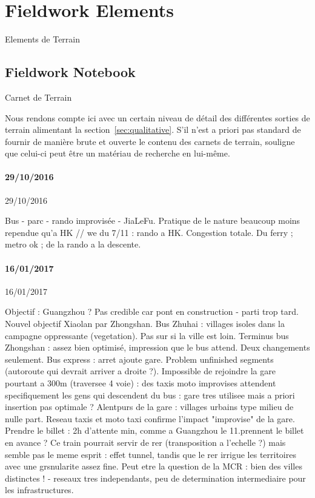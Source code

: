 




\section{Fieldwork Elements}{Elements de Terrain}

\label{app:sec:qualitative}



\subsection{Fieldwork Notebook}{Carnet de Terrain}

Nous rendons compte ici avec un certain niveau de détail des différentes sorties de terrain alimentant la section~\ref{sec:qualitative}. S'il n'est a priori pas standard de fournir de manière brute et ouverte le contenu des carnets de terrain, \cite{goffman1989fieldwork} souligne que celui-ci peut être un matériau de recherche en lui-même.



\paragraph{29/10/2016}{29/10/2016}

Bus - parc - rando improvisée - JiaLeFu.
Pratique de le nature beaucoup moins rependue qu'a HK
// we du 7/11 : rando a HK. Congestion totale. Du ferry ; metro ok ; de la rando a la descente.



\paragraph{16/01/2017}{16/01/2017}

Objectif : Guangzhou ? Pas credible car pont en construction - parti trop tard. Nouvel objectif Xiaolan par Zhongshan. Bus Zhuhai : villages isoles dans la campagne oppressante (vegetation). Pas sur si la ville est loin. Terminus bus Zhongshan : assez bien optimisé, impression que le bus attend. Deux changements seulement. Bus express : arret ajoute gare. Problem unfinished segments (autoroute qui devrait arriver a droite ?). Impossible de rejoindre la gare pourtant a 300m (traversee 4 voie) : des taxis moto improvises attendent specifiquement les gens qui descendent du bus : gare tres utilisee mais a priori insertion pas optimale ? Alentpurs de la gare : villages urbains type milieu de nulle part. Reseau taxis et moto taxi confirme l'impact "improvise" de la gare. Prendre le billet : 2h d'attente min, comme a Guangzhou le 11.prennent le billet en avance ? Ce train pourrait servir de rer (transposition a l'echelle ?) mais semble pas le meme esprit : effet tunnel, tandis que le rer irrigue les territoires avec une grsnularite assez fine. Peut etre la question de la MCR : bien des villes distinctes ! - reseaux tres independants, peu de determination intermediaire pour les infrastructures.


